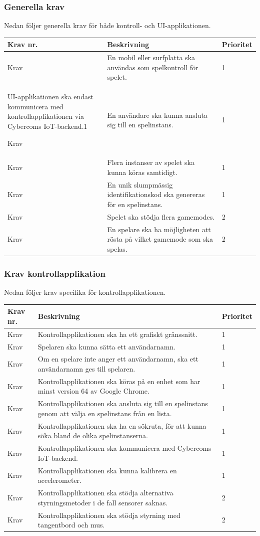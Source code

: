 \documentclass[10pt]{article}
\newcounter{indexcounter}
\newcommand{\Krav}[2]{
	\stepcounter{indexcounter}
	Krav \arabic{indexcounter} & #1 & #2 \\ \hline
}
\begin{document}
	\subsubsection*{Generella krav}
	Nedan följer generella krav för både kontroll- och UI-applikationen.\\
	
	\begin{tabular}{| p{2cm} | p{8cm} | p{2cm}|}
		\hline
		
		\textbf{Krav nr.} & \textbf{Beskrivning} &\textbf{Prioritet} \\ \hline
		\Krav{En mobil eller surfplatta ska användas som spelkontroll för spelet.}{1}
		\Krav{UI-applikationen ska endast kommunicera med \newline kontrollapplikationen via  Cybercoms IoT-backend.}{1}
		\Krav{En användare ska kunna ansluta sig till en spelinstans.}{1}
		\Krav{Flera instanser av spelet ska kunna köras samtidigt.}{1}
		\Krav{En unik slumpmässig identifikationskod ska genereras för en spelinstans.}{1}
		\Krav{Spelet ska stödja flera gamemodes.}{2}
		\Krav{En spelare ska ha möjligheten att rösta på vilket gamemode som ska spelas.}{2}
				
	\end{tabular}

	\subsubsection*{Krav kontrollapplikation}
	Nedan följer krav specifika för kontrollapplikationen.\\

	\begin{tabular}{| p{2cm} | p{8cm} | p{2cm}|}
		\hline
		
		\textbf{Krav nr.} & \textbf{Beskrivning} &\textbf{Prioritet} \\ \hline
		\Krav{Kontrollapplikationen ska ha ett grafiskt gränssnitt.}{1}
		\Krav{Spelaren ska kunna sätta ett användarnamn.}{1}
		\Krav{Om en spelare inte anger ett användarnamn, ska ett användarnamn ges till spelaren.}{1}
		\Krav{Kontrollapplikationen ska köras på en enhet som har minst version 64 av Google Chrome.}{1}
		\Krav{Kontrollapplikationen ska ansluta sig till en spelinstans genom att välja en spelinstans från en lista.}{1}
		\Krav{Kontrollapplikationen ska ha en sökruta, för att kunna söka bland de olika spelinstanserna.}{1}
		\Krav{Kontrollapplikationen ska kommunicera med Cybercoms IoT-backend.}{1}
		\Krav{Kontrollapplikationen ska kunna kalibrera en accelerometer.}{1}
		\Krav{Kontrollapplikationen ska stödja alternativa styrningsmetoder i de fall sensorer saknas.}{2}
		\Krav{Kontrollapplikationen ska stödja styrning med tangentbord och mus.}{2}

	\end{tabular}
\end{document}
